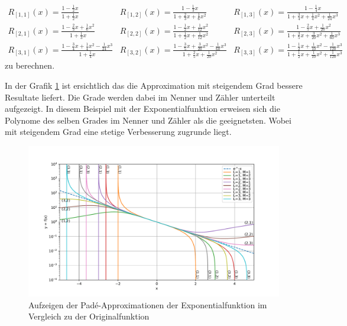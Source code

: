 \begin{equation}\begin{array}{lll}
R_{[1,1]}(x)=\frac{1-\frac{1}{2} x}{1+\frac{1}{2} x} & 
R_{[1,2]}(x)=\frac{1-\frac{1}{3} x}{1+\frac{2}{3} x+\frac{1}{6} x^{2}} & 
R_{[1,3]}(x)=\frac{1-\frac{1}{4} x}{1+\frac{3}{4} x+\frac{1}{4} x^{2}+\frac{1}{24} x^{3}} \\
R_{[2,1]}(x)=\frac{1-\frac{2}{3} x+\frac{1}{6} x^{2}}{1+\frac{1}{3} x} & 
R_{[2,2]}(x)=\frac{1-\frac{1}{2} x+\frac{1}{12} x^{2}}{1+\frac{1}{2} x+\frac{1}{12} x^{2}} &
R_{[2,3]}(x)=\frac{1-\frac{2}{5} x+\frac{1}{20} x^{2}}{1+\frac{3}{5} x+\frac{3}{20} x^{2}+\frac{1}{60} x^{3}} \\
R_{[3,1]}(x)=\frac{1-\frac{3}{4} x+\frac{1}{4} x^{2}-\frac{1}{24} x^{3}}{1+\frac{1}{4} x} &
R_{[3,2]}(x)=\frac{1-\frac{3}{5} x+\frac{3}{20} x^{2}-\frac{1}{60} x^{3}}{1+\frac{2}{5} x+\frac{1}{20} x^{2}} &
R_{[3,3]}(x)=\frac{1-\frac{1}{2} x+\frac{1}{10} x^{2}-\frac{1}{120} x^{3}}{1+\frac{1}{2} x+\frac{1}{10} x^{2}+\frac{1}{120} x^{3}}
\end{array}\end{equation}
zu berechnen.

In der Grafik \ref{pade:totzeitexp} ist ersichtlich das die Approximation mit steigendem Grad bessere Resultate liefert.
Die Grade werden dabei im Nenner und Zähler unterteilt aufgezeigt.
In diesem Beispiel mit der Exponentialfunktion erweisen sich die Polynome des selben Grades im Nenner und Zähler als die geeignetsten.
Wobei mit steigendem Grad eine stetige Verbesserung zugrunde liegt.
\begin{figure}
	\centering
	\includegraphics[width=1\linewidth]{./papers/pade/python/bilder/totzeit.pdf}
	\caption{Aufzeigen der Padé-Approximationen der Exponentialfunktion im Vergleich zu der Originalfunktion \label{pade:totzeitexp}}
\end{figure}

